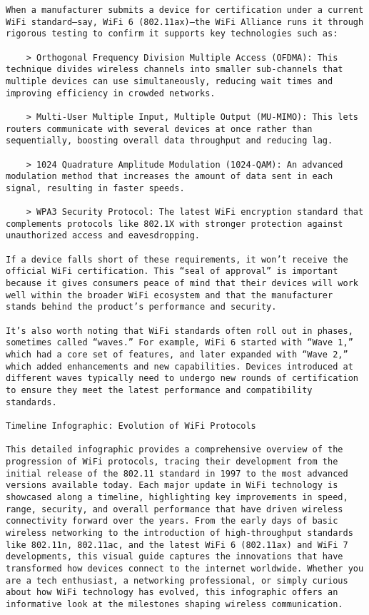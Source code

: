 \begin{verbatim}
When a manufacturer submits a device for certification under a current WiFi standard—say, WiFi 6 (802.11ax)—the WiFi Alliance runs it through rigorous testing to confirm it supports key technologies such as:

	> Orthogonal Frequency Division Multiple Access (OFDMA): This technique divides wireless channels into smaller sub-channels that multiple devices can use simultaneously, reducing wait times and improving efficiency in crowded networks.

	> Multi-User Multiple Input, Multiple Output (MU-MIMO): This lets routers communicate with several devices at once rather than sequentially, boosting overall data throughput and reducing lag.

	> 1024 Quadrature Amplitude Modulation (1024-QAM): An advanced modulation method that increases the amount of data sent in each signal, resulting in faster speeds.

	> WPA3 Security Protocol: The latest WiFi encryption standard that complements protocols like 802.1X with stronger protection against unauthorized access and eavesdropping.

If a device falls short of these requirements, it won’t receive the official WiFi certification. This “seal of approval” is important because it gives consumers peace of mind that their devices will work well within the broader WiFi ecosystem and that the manufacturer stands behind the product’s performance and security.

It’s also worth noting that WiFi standards often roll out in phases, sometimes called “waves.” For example, WiFi 6 started with “Wave 1,” which had a core set of features, and later expanded with “Wave 2,” which added enhancements and new capabilities. Devices introduced at different waves typically need to undergo new rounds of certification to ensure they meet the latest performance and compatibility standards.

Timeline Infographic: Evolution of WiFi Protocols

This detailed infographic provides a comprehensive overview of the progression of WiFi protocols, tracing their development from the initial release of the 802.11 standard in 1997 to the most advanced versions available today. Each major update in WiFi technology is showcased along a timeline, highlighting key improvements in speed, range, security, and overall performance that have driven wireless connectivity forward over the years. From the early days of basic wireless networking to the introduction of high-throughput standards like 802.11n, 802.11ac, and the latest WiFi 6 (802.11ax) and WiFi 7 developments, this visual guide captures the innovations that have transformed how devices connect to the internet worldwide. Whether you are a tech enthusiast, a networking professional, or simply curious about how WiFi technology has evolved, this infographic offers an informative look at the milestones shaping wireless communication.


\end{verbatim}
